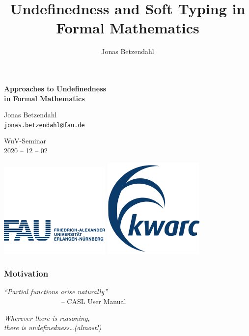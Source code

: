 \documentclass[aspectratio=169, usenames, dvipsnames]{beamer}
\author{Jonas Betzendahl}
\title{Undefinedness and Soft Typing in Formal Mathematics}
\begin{document}
\begin{frame}
\begin{center}
\Large \textbf{Approaches to Undefinedness\\ in Formal Mathematics}

\normalsize 
\bigskip\bigskip

\large Jonas Betzendahl\\
\texttt{jonas.betzendahl@fau.de}\bigskip

\small
WuV-Seminar\\
2020 -- 12 -- 02
\medskip

\includegraphics[scale=0.25]{images/fau_logo.png}
\quad
\includegraphics[scale=0.25]{images/kwarclogo_faublau.png} 
\end{center}
\end{frame}

\begin{frame}
\frametitle{Motivation}

\large
\begin{center}
\emph{``Partial functions arise naturally''}\\
$\qquad\qquad\qquad\qquad$ -- CASL User Manual
\bigskip\bigskip

\textit{Wherever there is reasoning,\\ there is undefinedness\dots (almost!)}
\end{center}

\end{frame}
\end{document}
